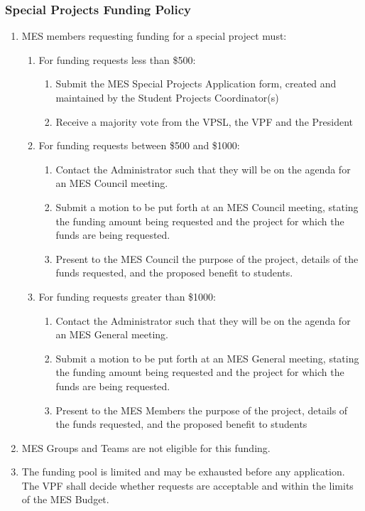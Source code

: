 \subsubsection{Special Projects Funding Policy}
\label{special-projects-funding-policy}
\begin{enumerate}
 \item
  MES members requesting funding for a special project must:

  \begin{enumerate}
   \item
    For funding requests less than \$500:

    \begin{enumerate}
     \item
      Submit the MES Special Projects Application form, created and maintained by the Student Projects Coordinator(s)
     \item
      Receive a majority vote from the VPSL, the VPF and the President
    \end{enumerate}
   \item
    For funding requests between \$500 and \$1000:

    \begin{enumerate}
     \item
      Contact the Administrator such that they will be on the agenda for an MES Council meeting.
     \item
      Submit a motion to be put forth at an MES Council meeting, stating the funding amount being requested and the project for which the funds are being requested.
     \item
      Present to the MES Council the purpose of the project, details of the funds requested, and the proposed benefit to students.
    \end{enumerate}
   \item
    For funding requests greater than \$1000:

    \begin{enumerate}
     \item
      Contact the Administrator such that they will be on the agenda for an MES General meeting.
     \item
      Submit a motion to be put forth at an MES General meeting, stating the funding amount being requested and the project for which the funds are being requested.
     \item
      Present to the MES Members the purpose of the project, details of the funds requested, and the proposed benefit to students
    \end{enumerate}
  \end{enumerate}
 \item
  MES Groups and Teams are not eligible for this funding.
 \item
  The funding pool is limited and may be exhausted before any application. The VPF shall decide whether requests are acceptable and within the limits of the MES Budget.

\end{enumerate}

